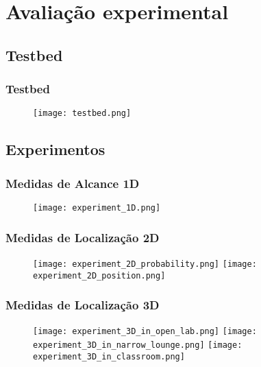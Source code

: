\section{Avaliação experimental}


\subsection{Testbed}

\begin{frame}
  \frametitle{Testbed}

  \begin{figure}
          \texttt{[image: testbed.png]}
  \end{figure}
\end{frame}

\subsection{Experimentos}

\begin{frame}
  \frametitle{Medidas de Alcance 1D}

  \begin{figure}
          \texttt{[image: experiment\_1D.png]}
  \end{figure}
\end{frame}

\begin{frame}
  \frametitle{Medidas de Localização 2D}

  \begin{figure}
          \texttt{[image: experiment\_2D\_probability.png]}
          \texttt{[image: experiment\_2D\_position.png]}
  \end{figure}
\end{frame}

\begin{frame}
  \frametitle{Medidas de Localização 3D}

  \begin{figure}
    \texttt{[image: experiment\_3D\_in\_open\_lab.png]}\hfil
    \texttt{[image: experiment\_3D\_in\_narrow\_lounge.png]}\newline
    \hfil\hfil\texttt{[image: experiment\_3D\_in\_classroom.png]}
        \end{figure}
\end{frame}

